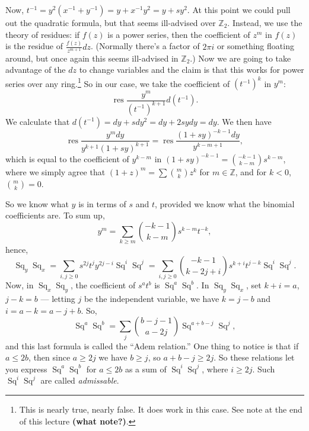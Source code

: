 \documentclass{article}
\newcommand{\Z}{\mathbb{Z}}
\DeclareMathOperator{\res}{res}
\DeclareMathOperator{\Sq}{Sq}
\theoremstyle{definition}
\begin{document}
Now, $t^{-1} = y^2(x^{-1} + y^{-1}) = y + x^{-1} y^2 = y + s y^2$.  At this point we could pull out the quadratic formula, but that seems ill-advised over $\Z_2$.  Instead, we use the theory of residues: if $f(z)$ is a power series, then the coefficient of $z^m$ in $f(z)$ is the residue of $\frac{f(z)}{z^{m+1}}dz$.  (Normally there's a factor of $2 \pi i$ or something floating around, but once again this seems ill-advised in $\Z_2$.)  Now we are going to take advantage of the $dz$ to change variables and the claim is that this works for power series over any ring.\footnote{This is nearly true, nearly false.  It does work in this case.  See note at the end of this lecture \textbf{(what note?)}. %
}  So in our case, we take the coefficient of $(t^{-1})^k$ in $y^m$: \[\res \frac{y^m}{(t^{-1})^{k+1}} d(t^{-1}).\]  We calculate that $d(t^{-1}) = dy + sdy^2 = dy + 2sydy = dy$.  We then have \[\res \frac{y^m dy}{y^{k+1}(1 + sy)^{k+1}} = \res \frac{(1+sy)^{-k-1} dy}{y^{k-m+1}},\] which is equal to the coefficient of $y^{k-m}$ in $(1+sy)^{-k-1} = \binom{-k-1}{k-m}s^{k-m}$, where we simply agree that $(1 + z)^m = \sum \binom{m}{k} z^k$ for $m \in \Z$, and for $k < 0$, $\binom{m}{k} = 0$.

So we know what $y$ is in terms of $s$ and $t$, provided we know what the binomial coefficients are.  To sum up,
\[
y^m = \sum_{k \ge m} \binom{-k-1}{k-m} s^{k-m} t^{-k}
,\]
hence,
\[
\Sq_y \Sq_x = \sum_{i, j \ge 0} s^{2j} t^j y^{2j-i} \Sq^i \Sq^j = \sum_{i, j \ge 0} \binom{-k-1}{k-2j+i} s^{k+i}t^{j-k}\Sq^i\Sq^j
.\]
Now, in $\Sq_x \Sq_y$, the coefficient of $s^a t^b$ is $\Sq^a \Sq^b$.  In $\Sq_y \Sq_x$, set $k + i = a$, $j - k = b$ --- letting $j$ be the independent variable, we have $k = j - b$ and $i = a - k = a - j + b$.  So,
\[
\Sq^a \Sq^b = \sum_j \binom{b-j-1}{a-2j} \Sq^{a+b-j} \Sq^j
,\]
and this last formula is called the ``Adem relation.''  One thing to notice is that if $a \le 2b$, then since $a \ge 2j$ we have $b \ge j$, so $a + b -j \ge 2j$.  So these relations let you express $\Sq^a \Sq^b$ for $a \le 2b$ as a sum of $\Sq^i \Sq^j$, where $i \ge 2j$.  Such $\Sq^i \Sq^j$ are called \emph{admissable}.
\end{document}
